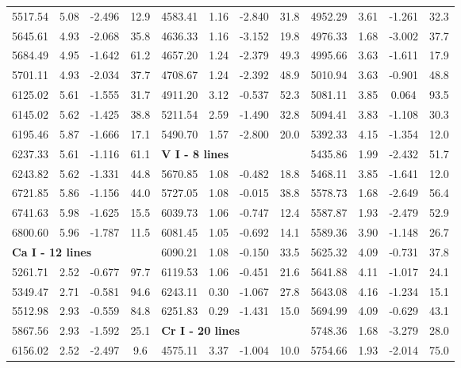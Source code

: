 \documentclass[dvips,12pt,a4paper]{report}
\begin{document}
{{\begin{table}[h!]
\begin{tabular}{c c c c | c c c c | c c c c}
5517.54 & 5.08 & -2.496 &  12.9 & 4583.41 & 1.16 & -2.840 &  31.8 & 4952.29 & 3.61 & -1.261 &  32.3 \\
5645.61 & 4.93 & -2.068 &  35.8 & 4636.33 & 1.16 & -3.152 &  19.8 & 4976.33 & 1.68 & -3.002 &  37.7 \\
5684.49 & 4.95 & -1.642 &  61.2 & 4657.20 & 1.24 & -2.379 &  49.3 & 4995.66 & 3.63 & -1.611 &  17.9 \\
5701.11 & 4.93 & -2.034 &  37.7 & 4708.67 & 1.24 & -2.392 &  48.9 & 5010.94 & 3.63 & -0.901 &  48.8 \\
6125.02 & 5.61 & -1.555 &  31.7 & 4911.20 & 3.12 & -0.537 &  52.3 & 5081.11 & 3.85 &  0.064 &  93.5 \\
6145.02 & 5.62 & -1.425 &  38.8 & 5211.54 & 2.59 & -1.490 &  32.8 & 5094.41 & 3.83 & -1.108 &  30.3 \\
6195.46 & 5.87 & -1.666 &  17.1 & 5490.70 & 1.57 & -2.800 &  20.0 & 5392.33 & 4.15 & -1.354 &  12.0 \\
6237.33 & 5.61 & -1.116 &  61.1 & \multicolumn{3}{l}{\textbf{V I - 8 lines}} & & 5435.86 & 1.99 & -2.432 &  51.7 \\
6243.82 & 5.62 & -1.331 &  44.8 & 5670.85 & 1.08 & -0.482 &  18.8 & 5468.11 & 3.85 & -1.641 &  12.0 \\
6721.85 & 5.86 & -1.156 &  44.0 & 5727.05 & 1.08 & -0.015 &  38.8 & 5578.73 & 1.68 & -2.649 &  56.4 \\
6741.63 & 5.98 & -1.625 &  15.5 & 6039.73 & 1.06 & -0.747 &  12.4 & 5587.87 & 1.93 & -2.479 &  52.9 \\
6800.60 & 5.96 & -1.787 &  11.5 & 6081.45 & 1.05 & -0.692 &  14.1 & 5589.36 & 3.90 & -1.148 &  26.7 \\
\multicolumn{3}{l}{\textbf{Ca I - 12 lines}} &  & 6090.21 & 1.08 & -0.150 &  33.5 & 5625.32 & 4.09 & -0.731 &  37.8 \\
5261.71 & 2.52 & -0.677 &  97.7 & 6119.53 & 1.06 & -0.451 &  21.6 & 5641.88 & 4.11 & -1.017 &  24.1 \\
5349.47 & 2.71 & -0.581 &  94.6 & 6243.11 & 0.30 & -1.067 &  27.8 & 5643.08 & 4.16 & -1.234 &  15.1 \\
5512.98 & 2.93 & -0.559 &  84.8 & 6251.83 & 0.29 & -1.431 &  15.0 & 5694.99 & 4.09 & -0.629 &  43.1 \\
5867.56 & 2.93 & -1.592 &  25.1 & \multicolumn{3}{l}{\textbf{Cr I - 20 lines}} &  & 5748.36 & 1.68 & -3.279 &  28.0 \\
6156.02 & 2.52 & -2.497 &   9.6 & 4575.11 & 3.37 & -1.004 &  10.0 & 5754.66 & 1.93 & -2.014 &  75.0 \\

\end{tabular}
\end{table}}}
\end{document}
